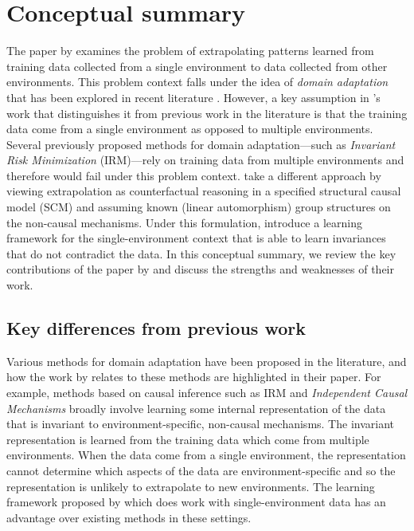 

\section{Conceptual summary}

The paper by \textcite{Mouli:2021} examines the problem of extrapolating patterns learned from training data collected from a single environment to data collected from other environments. This problem context falls under the idea of \textit{domain adaptation} that has been explored in recent literature \parencite{Farahani:2020}. However, a key assumption in \citeauthor{Mouli:2021}'s work that distinguishes it from previous work in the literature is that the training data come from a single environment as opposed to multiple environments. Several previously proposed methods for domain adaptation---such as \textit{Invariant Risk Minimization} \parencite{Arjovsky:2020} (IRM)---rely on training data from multiple environments and therefore would fail under this problem context. \citeauthor{Mouli:2021} take a different approach by viewing extrapolation as counterfactual reasoning in a specified structural causal model (SCM) and assuming known (linear automorphism) group structures on the non-causal mechanisms. Under this formulation, \citeauthor{Mouli:2021} introduce a learning framework for the single-environment context that is able to learn invariances that do not contradict the data. In this conceptual summary, we review the key contributions of the paper by \textcite{Mouli:2021} and discuss the strengths and weaknesses of their work.

\subsection{Key differences from previous work}

Various methods for domain adaptation have been proposed in the literature, and how the work by \textcite{Mouli:2021} relates to these methods are highlighted in their paper. For example, methods based on causal inference such as IRM and \textit{Independent Causal Mechanisms} \parencite{Parascandolo:2018} broadly involve learning some internal representation of the data that is invariant to environment-specific, non-causal mechanisms. The invariant representation is learned from the training data which come from multiple environments. When the data come from a single environment, the representation cannot determine which aspects of the data are environment-specific and so the representation is unlikely to extrapolate to new environments. The learning framework proposed by \citeauthor{Mouli:2021} which does work with single-environment data has an advantage over existing methods in these settings.
\\

